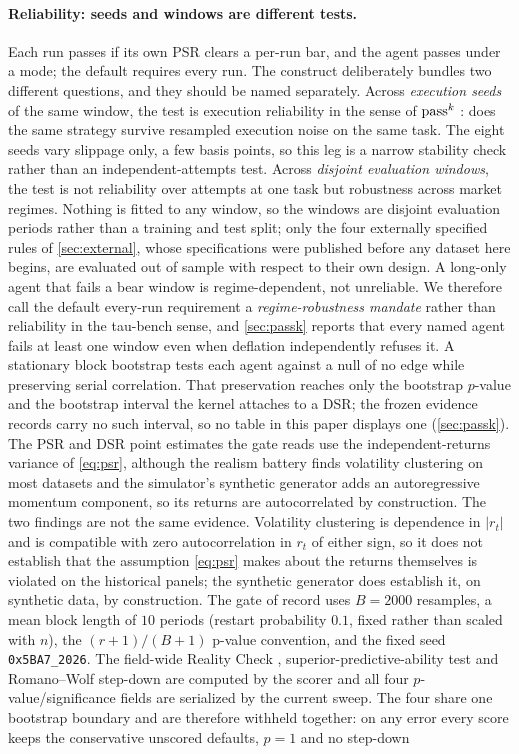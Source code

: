 \paragraph{Reliability: seeds and windows are different tests.} Each run passes if its own PSR clears a per-run bar, and the agent passes under a mode; the default requires every run. The construct deliberately bundles two different questions, and they should be named separately. Across \emph{execution seeds} of the same window, the test is execution reliability in the sense of $\text{pass}^{k}$ \citep{taubench2025}: does the same strategy survive resampled execution noise on the same task. The eight seeds vary slippage only, a few basis points, so this leg is a narrow stability check rather than an independent-attempts test. Across \emph{disjoint evaluation windows}, the test is not reliability over attempts at one task but robustness across market regimes. Nothing is fitted to any window, so the windows are disjoint evaluation periods rather than a training and test split; only the four externally specified rules of \cref{sec:external}, whose specifications were published before any dataset here begins, are evaluated out of sample with respect to their own design. A long-only agent that fails a bear window is regime-dependent, not unreliable. We therefore call the default every-run requirement a \emph{regime-robustness mandate} rather than reliability in the tau-bench sense, and \cref{sec:passk} reports that every named agent fails at least one window even when deflation independently refuses it. A stationary block bootstrap \citep{politis1994stationary} tests each agent against a null of no edge while preserving serial correlation. That preservation reaches only the bootstrap $p$-value and the bootstrap interval the kernel attaches to a DSR; the frozen evidence records carry no such interval, so no table in this paper displays one (\cref{sec:passk}). The PSR and DSR point estimates the gate reads use the independent-returns variance of \cref{eq:psr}, although the realism battery finds volatility clustering on most datasets and the simulator's synthetic generator adds an autoregressive momentum component, so its returns are autocorrelated by construction. The two findings are not the same evidence. Volatility clustering is dependence in $|r_t|$ and is compatible with zero autocorrelation in $r_t$ of either sign, so it does not establish that the assumption \cref{eq:psr} makes about the returns themselves is violated on the historical panels; the synthetic generator does establish it, on synthetic data, by construction. The gate of record uses $B = 2000$ resamples, a mean block length of $10$ periods (restart probability $0.1$, fixed rather than scaled with $n$), the $(r+1)/(B+1)$ p-value convention, and the fixed seed \texttt{0x5BA7\_2026}. The field-wide Reality Check \citep{white2000reality}, superior-predictive-ability test \citep{hansen2005spa} and Romano--Wolf step-down \citep{romano2005stepwise} are computed by the scorer and all four $p$-value/significance fields are serialized by the current sweep. The four share one bootstrap boundary and are therefore withheld together: on any error every score keeps the conservative unscored defaults, $p = 1$ and no step-down 